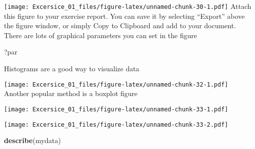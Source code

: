 \documentclass[]{article}
\newenvironment{Shaded}{\begin{snugshade}}{\end{snugshade}}
\newcommand{\DataTypeTok}[1]{\textcolor[rgb]{0.13,0.29,0.53}{#1}}
\newcommand{\DecValTok}[1]{\textcolor[rgb]{0.00,0.00,0.81}{#1}}
\newcommand{\KeywordTok}[1]{\textcolor[rgb]{0.13,0.29,0.53}{\textbf{#1}}}
\newcommand{\NormalTok}[1]{#1}
\newcommand{\OperatorTok}[1]{\textcolor[rgb]{0.81,0.36,0.00}{\textbf{#1}}}
\begin{document}
\texttt{[image: Excersice\_01\_files/figure-latex/unnamed-chunk-30-1.pdf]}
Attach this figure to your exercise report. You can save it by selecting
``Export'' above the figure window, or simply Copy to Clipboard and add
to your document. There are lots of graphical parameters you can set in
the figure

\begin{Shaded}
\begin{Highlighting}[]
\NormalTok{?par}
\end{Highlighting}
\end{Shaded}

Histograms are a good way to visualize data

\begin{Shaded}
\end{Shaded}

\texttt{[image: Excersice\_01\_files/figure-latex/unnamed-chunk-32-1.pdf]}
Another popular method is a boxplot figure

\begin{Shaded}
\end{Shaded}

\texttt{[image: Excersice\_01\_files/figure-latex/unnamed-chunk-33-1.pdf]}

\begin{Shaded}
\end{Shaded}

\texttt{[image: Excersice\_01\_files/figure-latex/unnamed-chunk-33-2.pdf]}

\begin{Shaded}
\begin{Highlighting}[]
\KeywordTok{describe}\NormalTok{(mydata)}
\end{Highlighting}
\end{Shaded}
\end{document}
